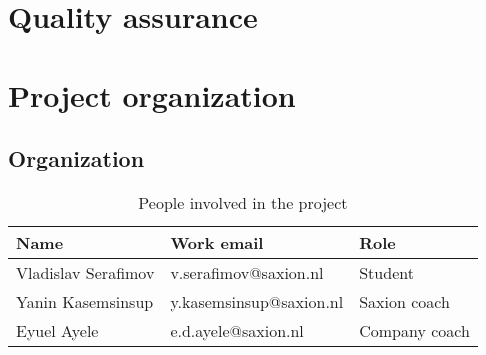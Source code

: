 \documentclass{report}
\begin{document}
	
	\chapter{Quality assurance}\label{quality_assurance}
	
	
	
	
	
	\chapter{Project organization}
	
	\section{Organization}
	
	\begin{table}[h]
		\centering
		\begin{tabular}{|l|l|l|}
			\hline
			Name                & Work email              & Role          \\ \hline
			Vladislav Serafimov & v.serafimov@saxion.nl   & Student       \\ \hline
			Yanin Kasemsinsup   & y.kasemsinsup@saxion.nl & Saxion coach  \\ \hline
			Eyuel Ayele         & e.d.ayele@saxion.nl     & Company coach \\ \hline
		\end{tabular}
		\caption{People involved in the project}
		\label{involved}
	\end{table}
	
\end{document}
